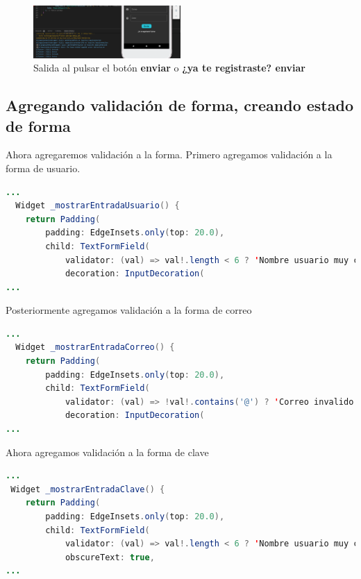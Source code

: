 \begin{figure}[htb]
\centering
\includegraphics[width=0.5\textwidth]{capitulo1/enviar_entrar.png}
\caption{Salida al pulsar el botón \textbf{enviar} o \textbf{¿ya te registraste? enviar}}
\label{cap1:007}
\end{figure} 


\subsection{Agregando validación de forma, creando estado de forma}

Ahora agregaremos validación a la forma. Primero agregamos validación a la forma de usuario.

\begin{lstlisting}[language=java]
...
  Widget _mostrarEntradaUsuario() {
    return Padding(
        padding: EdgeInsets.only(top: 20.0),
        child: TextFormField(
            validator: (val) => val!.length < 6 ? 'Nombre usuario muy corto': null,
            decoration: InputDecoration(
...
\end{lstlisting}


Posteriormente agregamos validación a la forma de correo

\begin{lstlisting}[language=java]
...
  Widget _mostrarEntradaCorreo() {
    return Padding(
        padding: EdgeInsets.only(top: 20.0),
        child: TextFormField(
            validator: (val) => !val!.contains('@') ? 'Correo invalido':null,
            decoration: InputDecoration(
...
\end{lstlisting}

Ahora agregamos validación a la forma de clave

\begin{lstlisting}[language=java]
...
 Widget _mostrarEntradaClave() {
    return Padding(
        padding: EdgeInsets.only(top: 20.0),
        child: TextFormField(
            validator: (val) => val!.length < 6 ? 'Nombre usuario muy corto': null,
            obscureText: true,
...
\end{lstlisting}

